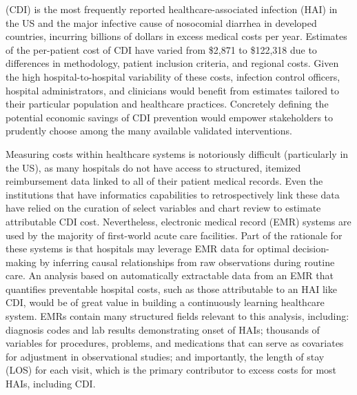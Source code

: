  (CDI) is the most frequently reported healthcare-associated infection (HAI) in the US and the major infective cause of nosocomial diarrhea in developed countries, incurring billions of dollars in excess medical costs per year.\autocite{Zimlichman2013} Estimates of the per-patient cost of CDI have varied from \$2,871 to \$122,318 due to differences in methodology, patient inclusion criteria, and regional costs.\autocite{Gabriel2014,Ghantoji2010,Zhang2016} Given the high hospital-to-hospital variability of these costs,\autocite{Lofgren2014,Stevens2015} infection control officers, hospital administrators, and clinicians would benefit from estimates tailored to their particular population and healthcare practices. Concretely defining the potential economic savings of CDI prevention would empower stakeholders to prudently choose among the many available validated interventions.\autocite{Dubberke2014a,Katz2013}

Measuring costs within healthcare systems is notoriously difficult (particularly in the US), as many hospitals do not have access to structured, itemized reimbursement data linked to all of their patient medical records.\autocite{Cooper2015} Even the institutions that have informatics capabilities to retrospectively link these data have relied on the curation of select variables and chart review to estimate attributable CDI cost.\autocite{Dubberke2008,Dubberke2014,Greco2015} Nevertheless, electronic medical record (EMR) systems are used by the majority of first-world acute care facilities.\autocite{Gray2011,Henry2016} Part of the rationale for these systems is that hospitals may leverage EMR data for optimal decision-making by inferring causal relationships from raw observations during routine care.\autocite{Dahabreh2014,Etheredge2007,Pak2015} An analysis based on automatically extractable data from an EMR that quantifies preventable hospital costs, such as those attributable to an HAI like CDI, would be of great value in building a continuously learning healthcare system.\autocite{Krumholz2016} EMRs contain many structured fields relevant to this analysis, including: diagnosis codes and lab results demonstrating onset of HAIs; thousands of variables for procedures, problems, and medications that can serve as covariates for adjustment in observational studies; and importantly, the length of stay (LOS) for each visit, which is the primary contributor to excess costs for most HAIs, including CDI.\autocite{McGlone2012,Wilcox1996,Zimlichman2013}


